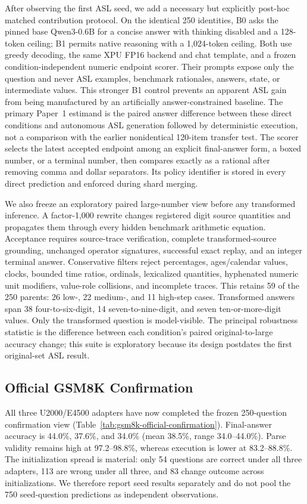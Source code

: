 \documentclass[11pt]{article}
\begin{document}
After observing the first ASL seed, we add a necessary but explicitly post-hoc
matched contribution protocol. On the identical 250 identities, B0 asks the
pinned base Qwen3-0.6B for a concise answer with thinking disabled and a
128-token ceiling; B1 permits native reasoning with a 1,024-token ceiling. Both
use greedy decoding, the same XPU FP16 backend and chat template, and a frozen
condition-independent numeric endpoint scorer. Their prompts expose only the
question and never ASL examples, benchmark rationales, answers, state, or
intermediate values. This stronger B1 control prevents an apparent ASL gain
from being manufactured by an artificially answer-constrained baseline. The
primary Paper~1 estimand is the paired answer difference between these direct
conditions and autonomous ASL generation followed by deterministic execution,
not a comparison with the earlier nonidentical 120-item transfer test.
The scorer selects the latest accepted endpoint among an explicit final-answer
form, a boxed number, or a terminal number, then compares exactly as a rational
after removing comma and dollar separators. Its policy identifier is stored in
every direct prediction and enforced during shard merging.

We also freeze an exploratory paired large-number view before any transformed
inference. A factor-1,000 rewrite changes registered digit source quantities and
propagates them through every hidden benchmark arithmetic equation. Acceptance
requires source-trace verification, complete transformed-source grounding,
unchanged operator signatures, successful exact replay, and an integer terminal
answer. Conservative filters reject percentages, ages/calendar values, clocks,
bounded time ratios, ordinals, lexicalized quantities, hyphenated numeric unit
modifiers, value-role collisions, and incomplete traces. This retains 59 of the
250 parents: 26 low-, 22 medium-, and 11 high-step cases. Transformed answers
span 38 four-to-six-digit, 14 seven-to-nine-digit, and seven ten-or-more-digit
values. Only the transformed question is model-visible. The principal
robustness statistic is the difference between each condition's paired
original-to-large accuracy change; this suite is exploratory because its design
postdates the first original-set ASL result.

\subsection{Official GSM8K Confirmation}

All three U2000/E4500 adapters have now completed the frozen 250-question
confirmation view (Table~\ref{tab:gsm8k-official-confirmation}). Final-answer
accuracy is 44.0\%, 37.6\%, and 34.0\% (mean 38.5\%, range 34.0--44.0\%). Parse
validity remains high at 97.2--98.8\%, whereas execution is lower at
83.2--88.8\%. The initialization spread is material: only 54 questions are
correct under all three adapters, 113 are wrong under all three, and 83 change
outcome across initializations. We therefore report seed results separately and
do not pool the 750 seed-question predictions as independent observations.
\end{document}
